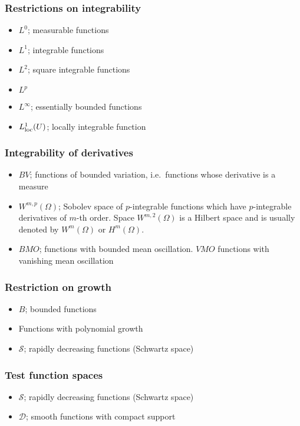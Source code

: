 \documentclass[12pt]{article}
\begin{document}
\subsubsection*{Restrictions on integrability}
\begin{itemize}
\item $L^0$; measurable functions
\item $L^1$; integrable functions
\item $L^2$; square integrable functions
\item $L^p$ 
\item $L^\infty$; essentially bounded functions
\item $L^1_{\scriptsize{\mbox{loc}}}(U)$; locally integrable function 
\end{itemize}
\subsubsection*{Integrability of derivatives}
\begin{itemize}
\item $BV$; functions of bounded variation, i.e.\ functions whose derivative is a measure
\item $W^{m,p}(\Omega)$; Sobolev space of $p$-integrable functions which have $p$-integrable derivatives of $m$-th order. Space $W^{m,2}(\Omega)$ is a Hilbert space and is usually denoted by $W^{m}(\Omega)$ or $H^{m}(\Omega)$.
\item $BMO$; functions with bounded mean oscillation. $VMO$ functions with vanishing mean oscillation
\end{itemize}

\subsubsection*{Restriction on growth}
\begin{itemize}
\item $B$; bounded functions
\item Functions with polynomial growth
\item $\mathscr{S}$; rapidly decreasing functions (Schwartz space)
\end{itemize}

\subsubsection*{Test function spaces}
\begin{itemize}
\item $\mathscr{S}$; rapidly decreasing functions (Schwartz space)
\item $\mathscr{D}$; smooth functions with compact support
\end{itemize}
\end{document}

